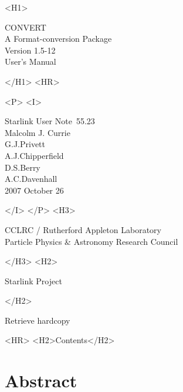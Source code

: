 \documentclass[twoside,11pt]{article}
\newcommand{\stardoccategory}  {Starlink User Note}
\newcommand{\stardocsource}    {sun\stardocnumber}
\newcommand{\stardocnumber}    {55.23}
\newcommand{\stardocauthors}   {Malcolm J. Currie\\
                                G.J.Privett\\
                                A.J.Chipperfield\\
                                D.S.Berry\\
                                A.C.Davenhall}
\newcommand{\stardocdate}      {2007 October 26}
\newcommand{\stardoctitle}     {CONVERT\\
                                A Format-conversion Package}
\newcommand{\stardocversion}   {Version 1.5-12}
\newcommand{\stardocmanual}    {User's Manual}
\newcommand{\htmladdnormallink}[2]{#1}
\newcommand{\htmladdimg}[1]{}
\newcommand{\htmlref}[2]{#1}
\newcommand{\htmladdtonavigation}[1]{}
\newcommand{\xlabel}[1]{}
\begin{document}
\begin{htmlonly}
   \xlabel{}
   \begin{rawhtml} <H1> \end{rawhtml}
      \stardoctitle\\
      \stardocversion\\
      \stardocmanual
   \begin{rawhtml} </H1> <HR> \end{rawhtml}


   \begin{rawhtml} <P> <I> \end{rawhtml}
   \stardoccategory\ \stardocnumber \\
   \stardocauthors \\
   \stardocdate
   \begin{rawhtml} </I> </P> <H3> \end{rawhtml}
      \htmladdnormallink{CCLRC / Rutherford Appleton Laboratory}
                        {http://www.cclrc.ac.uk} \\
      \htmladdnormallink{Particle Physics \& Astronomy Research Council}
                        {http://www.pparc.ac.uk} \\
   \begin{rawhtml} </H3> <H2> \end{rawhtml}
      \htmladdnormallink{Starlink Project}{http://www.starlink.rl.ac.uk/}
   \begin{rawhtml} </H2> \end{rawhtml}
   \htmladdnormallink{\htmladdimg{source.gif} Retrieve hardcopy}
      {http://www.starlink.rl.ac.uk/cgi-bin/hcserver?\stardocsource}\\

  \label{stardoccontents}
  \begin{rawhtml} 
    <HR>
    <H2>Contents</H2>
  \end{rawhtml}
  \htmladdtonavigation{\htmlref{\htmladdimg{contents_motif.gif}}
        {stardoccontents}}

  \section{\xlabel{abstract}Abstract}
\end{htmlonly}
\end{document}
